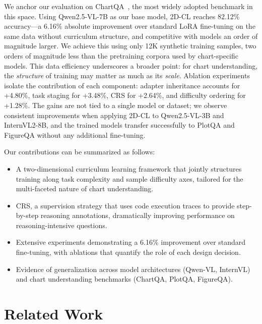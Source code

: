 \documentclass[journal]{IEEEtran}
\newcommand{\method}{2D-CL}
\newcommand{\crs}{CRS}
\begin{document}
We anchor our evaluation on ChartQA~\cite{masry2022chartqa}, the most widely adopted benchmark in this space. Using Qwen2.5-VL-7B as our base model, \method{} reaches 82.12\% accuracy---a 6.16\% absolute improvement over standard LoRA fine-tuning on the same data without curriculum structure, and competitive with models an order of magnitude larger. We achieve this using only 12K synthetic training samples, two orders of magnitude less than the pretraining corpora used by chart-specific models. This data efficiency underscores a broader point: for chart understanding, the \emph{structure} of training may matter as much as its \emph{scale}. Ablation experiments isolate the contribution of each component: adapter inheritance accounts for +4.80\%, task staging for +3.48\%, \crs{} for +2.64\%, and difficulty ordering for +1.28\%. The gains are not tied to a single model or dataset; we observe consistent improvements when applying \method{} to Qwen2.5-VL-3B and InternVL2-8B, and the trained models transfer successfully to PlotQA and FigureQA without any additional fine-tuning.

Our contributions can be summarized as follows:
\begin{itemize}
    \item A two-dimensional curriculum learning framework that jointly structures training along task complexity and sample difficulty axes, tailored for the multi-faceted nature of chart understanding.
    \item \crs{}, a supervision strategy that uses code execution traces to provide step-by-step reasoning annotations, dramatically improving performance on reasoning-intensive questions.
    \item Extensive experiments demonstrating a 6.16\% improvement over standard fine-tuning, with ablations that quantify the role of each design decision.
    \item Evidence of generalization across model architectures (Qwen-VL, InternVL) and chart understanding benchmarks (ChartQA, PlotQA, FigureQA).
\end{itemize}

\section{Related Work}
\end{document}
